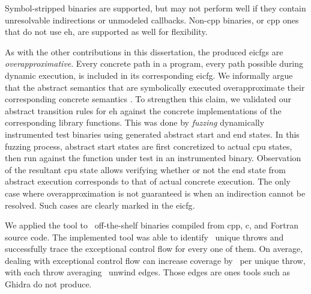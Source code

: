 Symbol-stripped binaries are supported, but may not perform well if they contain unresolvable indirections or unmodeled callbacks.
Non-\gls{cpp} binaries, or \gls{cpp} ones that do not use \ac{eh}, are supported as well for flexibility.

As with the other contributions in this dissertation, the produced \acp{eicfg} are \emph{overapproximative}.
Every concrete path in a program, every path possible during dynamic execution, is included in its corresponding \ac{eicfg}.
We informally argue that the abstract semantics that are symbolically executed overapproximate their corresponding concrete semantics \autocite{cousot1996abstract}.
To strengthen this claim, we validated our abstract transition rules for \ac{eh} against the concrete implementations of the corresponding library functions.
This was done by \emph{fuzzing} dynamically instrumented test binaries using generated abstract start and end states.
In this fuzzing process, abstract start states are first concretized to actual \ac{cpu} states, then run against the function under test in an instrumented binary.
Observation of the resultant \ac{cpu} state allows verifying whether or not the end state from abstract execution corresponds to that of actual concrete execution.
The only case where overapproximation is not guaranteed is when an indirection cannot be resolved.
Such cases are clearly marked in the \ac{eicfg}.

We applied the tool to \totalbins\ off-the-shelf binaries compiled from \gls{cpp}, \gls{c}, and Fortran source code.
The implemented tool was able to identify \uniquethrows\ unique throws and successfully trace the exceptional control flow for every one of them.
On average, dealing with exceptional control flow can increase coverage by \avgdiffinst\ per unique throw, with each throw averaging \avgunwinds\ unwind edges.
Those edges are ones tools such as Ghidra \autocite{ghidra} do not produce.

